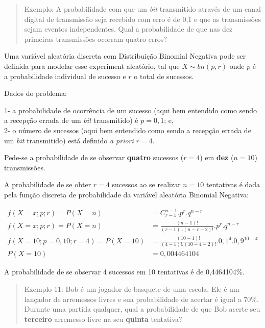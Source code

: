 \documentclass[
]{book}
\begin{document}
\hfill\break

\begin{quote}
Exemplo: A probabilidade com que um \emph{bit} transmitido através de um canal digital de transmissão seja recebido com erro é de 0,1 e que as transmissões sejam eventos independentes. Qual a probabilidade de que nas dez primeiras transmissões ocorram quatro erros?
\end{quote}

\hfill\break

Uma variável aleatória discreta com Distribuição Binomial Negativa pode ser definida para modelar esse experiment aleatório, tal que \(X\sim bn(p,r)\) onde \(p\) é a probabilidade individual de sucesso e \(r\) o total de sucessos.

\hfill\break

Dados do problema:

\hfill\break

1- a probabilidade de ocorrência de um sucesso (aqui bem entendido como sendo a recepção errada de um \emph{bit} transmitido) é \(p=0,1\); e,\\
2- o número de sucessos (aqui bem entendido como sendo a recepção errada de um \emph{bit} transmitido) está definido \emph{a priori} \(r=4\).

\hfill\break

Pede-se a probabilidade de se observar \textbf{quatro} sucessos (\(r=4\)) em \textbf{dez} (\(n=10\)) transmissões.

\hfill\break

A probabilidade de se obter \(r=4\) sucessos ao se realizar \(n=10\) tentativas é dada pela função discreta de probabilidade da variável aleatória Binomial Negativa:

\begin{align*}
f(X=x; p; r) = P(X=n) & = {C}_{r-1}^{n-1} . {p}^{r}. {q}^{n-r} \\
f(X=x; p; r) = P(X=n) & = \frac{(n-1)!}{ (r-1)!. (n-r-2)!} . {p}^{r}. {q}^{n-r} \\ 
f(X=10; p=0,10 ; r=4) = P(X=10) & = \frac{(10-1)!}{ (4-1)!. (10-4-2)!} . {0,1}^{4}. {0,9}^{10-4} \\
P(X=10) & = 0,004464104
\end{align*}

A probabilidade de se observar 4 sucessos em 10 tentativas é de 0,4464104\%.

\hfill\break

\begin{quote}
Exemplo 11: Bob é um jogador de basquete de uma escola. Ele é um lançador de arremessos livres e sua probabilidade de acertar é igual a 70\%. Durante uma partida qualquer, qual a probabilidade de que Bob acerte seu \textbf{terceiro} arremesso livre na seu \textbf{quinta} tentativa?
\end{quote}
\end{document}
